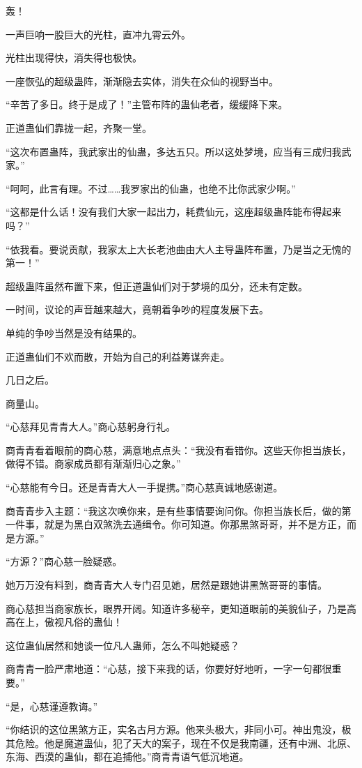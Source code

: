 \begin{this_body}
轰！

一声巨响一股巨大的光柱，直冲九霄云外。

光柱出现得快，消失得也极快。

一座恢弘的超级蛊阵，渐渐隐去实体，消失在众仙的视野当中。

“辛苦了多日。终于是成了！”主管布阵的蛊仙老者，缓缓降下来。

正道蛊仙们靠拢一起，齐聚一堂。

“这次布置蛊阵，我武家出的仙蛊，多达五只。所以这处梦境，应当有三成归我武家。”

“呵呵，此言有理。不过……我罗家出的仙蛊，也绝不比你武家少啊。”

“这都是什么话！没有我们大家一起出力，耗费仙元，这座超级蛊阵能布得起来吗？”

“依我看。要说贡献，我家太上大长老池曲由大人主导蛊阵布置，乃是当之无愧的第一！”

超级蛊阵虽然布置下来，但正道蛊仙们对于梦境的瓜分，还未有定数。

一时间，议论的声音越来越大，竟朝着争吵的程度发展下去。

单纯的争吵当然是没有结果的。

正道蛊仙们不欢而散，开始为自己的利益筹谋奔走。

几日之后。

商量山。

“心慈拜见青青大人。”商心慈躬身行礼。

商青青看着眼前的商心慈，满意地点点头：“我没有看错你。这些天你担当族长，做得不错。商家成员都有渐渐归心之象。”

“心慈能有今日。还是青青大人一手提携。”商心慈真诚地感谢道。

商青青步入主题：“我这次唤你来，是有些事情要询问你。你担当族长后，做的第一件事，就是为黑白双煞洗去通缉令。你可知道。你那黑煞哥哥，并不是方正，而是方源。”

“方源？”商心慈一脸疑惑。

她万万没有料到，商青青大人专门召见她，居然是跟她讲黑煞哥哥的事情。

商心慈担当商家族长，眼界开阔。知道许多秘辛，更知道眼前的美貌仙子，乃是高高在上，傲视凡俗的蛊仙！

这位蛊仙居然和她谈一位凡人蛊师，怎么不叫她疑惑？

商青青一脸严肃地道：“心慈，接下来我的话，你要好好地听，一字一句都很重要。”

“是，心慈谨遵教诲。”

“你结识的这位黑煞方正，实名古月方源。他来头极大，非同小可。神出鬼没，极其危险。他是魔道蛊仙，犯了天大的案子，现在不仅是我南疆，还有中洲、北原、东海、西漠的蛊仙，都在追捕他。”商青青语气低沉地道。


\end{this_body}
